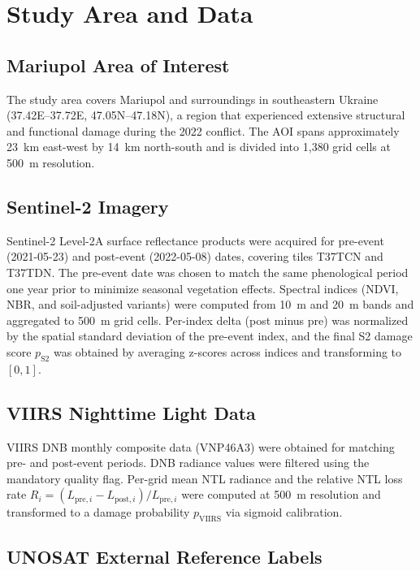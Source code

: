 \documentclass[wcp]{jmlr}
\begin{document}
\section{Study Area and Data}\label{sec:data}

\subsection{Mariupol Area of Interest}

The study area covers Mariupol and surroundings in southeastern Ukraine
(37.42\textdegree{}E--37.72\textdegree{}E, 47.05\textdegree{}N--47.18\textdegree{}N),
a region that experienced extensive structural and functional damage during
the 2022 conflict. The AOI spans approximately 23~km east-west by 14~km
north-south and is divided into 1{,}380 grid cells at 500~m resolution.

\subsection{Sentinel-2 Imagery}

Sentinel-2 Level-2A surface reflectance products were acquired for
pre-event (2021-05-23) and post-event (2022-05-08) dates, covering tiles
T37TCN and T37TDN. The pre-event date was chosen to match the same
phenological period one year prior to minimize seasonal vegetation effects.
Spectral indices (NDVI, NBR, and soil-adjusted variants) were computed from
10~m and 20~m bands and aggregated to 500~m grid cells. Per-index delta
(post minus pre) was normalized by the spatial standard deviation of the
pre-event index, and the final S2 damage score $p_{\text{S2}}$ was obtained
by averaging z-scores across indices and transforming to $[0,1]$.

\subsection{VIIRS Nighttime Light Data}

VIIRS DNB monthly composite data (VNP46A3) were obtained for matching pre-
and post-event periods. DNB radiance values were filtered using the
mandatory quality flag. Per-grid mean NTL radiance and the relative NTL
loss rate $R_i = (L_{\text{pre},i} - L_{\text{post},i})/L_{\text{pre},i}$
were computed at 500~m resolution and transformed to a damage probability
$p_{\text{VIIRS}}$ via sigmoid calibration.

\subsection{UNOSAT External Reference Labels}
\end{document}
